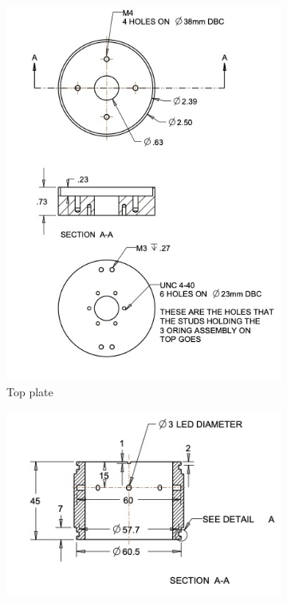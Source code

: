 \documentclass[12pt]{article}
\begin{document}
\begin{figure}
  \begin{center}
  \begin{subfigure}{0.4\textwidth}
    \includegraphics[width=\textwidth]{UFOTopPlate}
    \caption{Top plate}
  \end{subfigure}
  \begin{subfigure}{0.4\textwidth}
    \includegraphics[width=\textwidth]{UFOAcrylicHousing}

\end{subfigure}
\end{center}
\end{figure}
\end{document}

